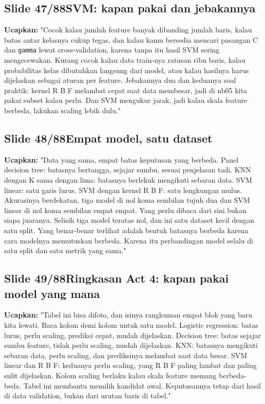 \documentclass[11pt]{article}
\renewcommand{\framebox}[1]{\colorbox{acc!15}{\textcolor{acc}{\textbf{#1}}}}
\begin{document}
\subsection*{\framebox{Slide 47/88}\quad SVM: kapan pakai dan jebakannya}
\textbf{Ucapkan:} "Cocok kalau jumlah feature banyak dibanding jumlah baris, kalau batas antar kelasnya cukup tegas, dan kalau kamu bersedia mencari pasangan C dan \texttt{gamma} lewat cross-validation, karena tanpa itu hasil SVM sering mengecewakan. Kurang cocok kalau data train-nya ratusan ribu baris, kalau probabilitas kelas dibutuhkan langsung dari model, atau kalau hasilnya harus dijelaskan sebagai aturan per feature. Jebakannya dua dan keduanya soal praktik: kernel R B F melambat cepat saat data membesar, jadi di nb05 kita pakai subset kalau perlu. Dan SVM mengukur jarak, jadi kalau skala feature berbeda, lakukan scaling lebih dulu."\\[2pt]

\subsection*{\framebox{Slide 48/88}\quad Empat model, satu dataset}
\textbf{Ucapkan:} "Data yang sama, empat batas keputusan yang berbeda. Panel decision tree: batasnya bertangga, sejajar sumbu, sesuai penjelasan tadi. KNN dengan K sama dengan lima: batasnya berlekuk mengikuti sebaran data. SVM linear: satu garis lurus. SVM dengan kernel R B F: satu lengkungan mulus. Akurasinya berdekatan, tiga model di nol koma sembilan tujuh dua dan SVM linear di nol koma sembilan empat empat. Yang perlu dibaca dari sini bukan siapa juaranya. Selisih tiga model teratas nol, dan ini satu dataset kecil dengan satu split. Yang benar-benar terlihat adalah bentuk batasnya berbeda karena cara modelnya memutuskan berbeda. Karena itu perbandingan model selalu di satu split dan satu metrik yang sama."\\[2pt]

\subsection*{\framebox{Slide 49/88}\quad Ringkasan Act 4: kapan pakai model yang mana}
\textbf{Ucapkan:} "Tabel ini bisa difoto, dan isinya rangkuman empat blok yang baru kita lewati. Baca kolom demi kolom untuk satu model. Logistic regression: batas lurus, perlu scaling, prediksi cepat, mudah dijelaskan. Decision tree: batas sejajar sumbu feature, tidak perlu scaling, mudah dijelaskan. KNN: batasnya mengikuti sebaran data, perlu scaling, dan prediksinya melambat saat data besar. SVM linear dan R B F: keduanya perlu scaling, yang R B F paling lambat dan paling sulit dijelaskan. Kolom scaling berlaku kalau skala feature memang berbeda-beda. Tabel ini membantu memilih kandidat awal. Keputusannya tetap dari hasil di data validation, bukan dari urutan baris di tabel."\\[2pt]
\end{document}
